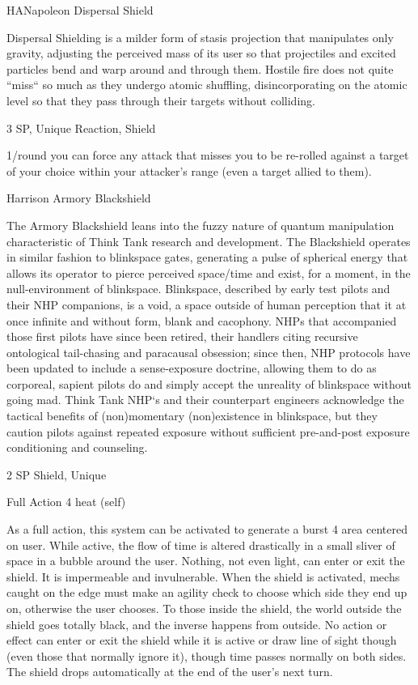 \begin{mech}{HA}{Napoleon}
Dispersal Shield

Dispersal Shielding is a milder form of stasis projection that manipulates only gravity, adjusting the perceived mass of its user so that projectiles and excited particles bend and warp around and through them. Hostile fire does not quite “miss“ so much as they undergo atomic shuffling, disincorporating on the atomic level so that they pass through their targets without colliding.

3 SP, Unique
Reaction, Shield

1/round you can force any attack that misses you to be re-rolled against a target of your choice within your attacker’s range (even a target allied to them).


Harrison Armory Blackshield

The Armory Blackshield leans into the fuzzy nature of quantum manipulation characteristic of Think Tank research and development. The Blackshield operates in similar fashion to blinkspace gates, generating a pulse of spherical energy that allows its operator to pierce perceived space/time and exist, for a moment, in the null-environment of blinkspace. Blinkspace, described by early test pilots and their NHP companions, is a void, a space outside of human perception that it at once infinite and without form, blank and cacophony. NHPs that accompanied those first pilots have since been retired, their handlers citing recursive ontological tail-chasing and paracausal obsession; since then, NHP protocols have been updated to include a sense-exposure doctrine, allowing them to do as corporeal, sapient pilots do and simply accept the unreality of blinkspace without going mad. Think Tank NHP‘s and their counterpart engineers acknowledge the tactical benefits of (non)momentary (non)existence in blinkspace, but they caution pilots against repeated exposure without sufficient pre-and-post exposure conditioning and counseling.

2 SP
Shield, Unique

Full Action
4 heat (self)

As a full action, this system can be activated to generate a burst 4 area centered on user. While active, the flow of time is altered drastically in a small sliver of space in a bubble around the user. Nothing, not even light, can enter or exit the shield. It is impermeable and invulnerable. When the shield is activated, mechs caught on the edge must make an agility check to choose which side they end up on, otherwise the user chooses. To those inside the shield, the world outside the shield goes totally black, and the inverse happens from outside. No action or effect can enter or exit the shield while it is active or draw line of sight though (even those that normally ignore it), though time passes normally on both sides. The shield drops automatically at the end of the user’s next turn.



\end{mech}
